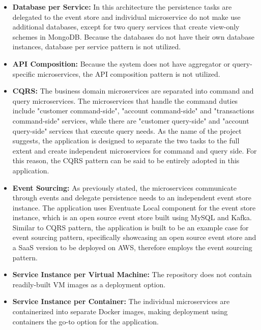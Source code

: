 \documentclass{Configuration_Files/PoliMi3i_thesis}
\begin{document}
\begin{itemize}
    \item \textbf{Database per Service:} In this architecture the persistence tasks are delegated to the event store and individual microservice do not make use additional databases, except for two query services that create view-only schemes in MongoDB.
    Because the databases do not have their own database instances, database per service pattern is not utilized.
    
    \item \textbf{API Composition:} Because the system does not have aggregator or query-specific microservices, the API composition pattern is not utilized.
    
    \item \textbf{CQRS:} The business domain microservices are separated into command and query microservices.
    The microservices that handle the command duties include "customer command-side", "account command-side" and "transactions command-side" services, while there are "customer query-side" and "account query-side" services that execute query needs.
    As the name of the project suggests, the application is designed to separate the two tasks to the full extent and create independent microservices for command and query side.
    For this reason, the CQRS pattern can be said to be entirely adopted in this application.
    
    \item \textbf{Event Sourcing:} As previously stated, the microservices communicate through events and delegate persistence needs to an independent event store instance.
    The application uses Eventuate Local\footnotemark[84] component for the event store instance, which is an open source event store built using MySQL and Kafka.
    Similar to CQRS pattern, the application is built to be an example case for event sourcing pattern, specifically showcasing an open source event store and a SaaS version to be deployed on AWS, therefore employs the event sourcing pattern.
    
    \item \textbf{Service Instance per Virtual Machine:} The repository does not contain readily-built VM images as a deployment option.
    
    \item \textbf{Service Instance per Container:} The individual microservices are containerized into separate Docker images, making deployment using containers the go-to option for the application.
    

\end{itemize}
\end{document}
